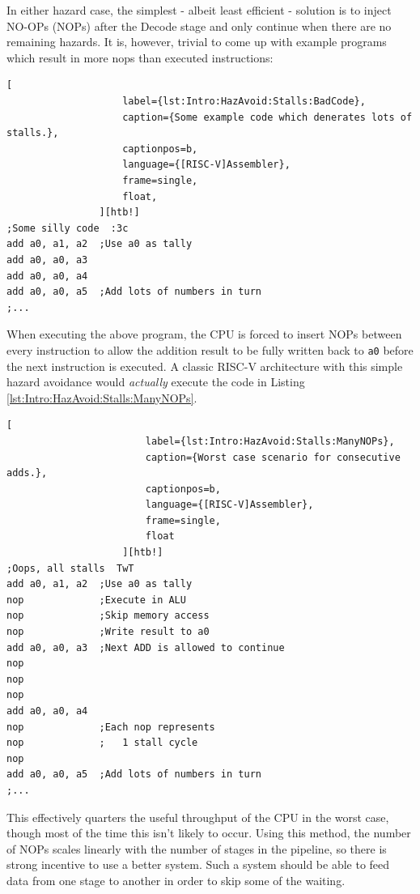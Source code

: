 \documentclass[a4paper, 11pt]{article}
\begin{document}
                In either hazard case, the simplest - albeit least efficient -
                solution is to inject NO-OPs (NOPs) after the Decode stage
                and only continue when there are no remaining hazards.
                It is, however, trivial to come up with example programs which
                result in more nops than executed instructions:

                \begin{lstlisting}[
                    label={lst:Intro:HazAvoid:Stalls:BadCode},
                    caption={Some example code which denerates lots of stalls.},
                    captionpos=b,
                    language={[RISC-V]Assembler}, 
                    frame=single,
                    float,
                ][htb!]
;Some silly code  :3c
add a0, a1, a2  ;Use a0 as tally
add a0, a0, a3
add a0, a0, a4
add a0, a0, a5  ;Add lots of numbers in turn
;...
                \end{lstlisting}

                When executing the above program, the CPU is forced to insert 
                NOPs between every instruction to allow the addition result to 
                be fully written back to 
                \lstinline[language={[RISC-V]Assembler}]|a0| before the next 
                instruction is executed. 
                A classic RISC-V architecture with this simple hazard avoidance 
                would \emph{actually} execute the code in Listing 
                \ref{lst:Intro:HazAvoid:Stalls:ManyNOPs}.

                \begin{lstlisting}[
                        label={lst:Intro:HazAvoid:Stalls:ManyNOPs},
                        caption={Worst case scenario for consecutive adds.},
                        captionpos=b,
                        language={[RISC-V]Assembler},
                        frame=single,
                        float
                    ][htb!]
;Oops, all stalls  TwT
add a0, a1, a2  ;Use a0 as tally
nop             ;Execute in ALU
nop             ;Skip memory access
nop             ;Write result to a0
add a0, a0, a3  ;Next ADD is allowed to continue
nop
nop
nop
add a0, a0, a4
nop             ;Each nop represents
nop             ;   1 stall cycle
nop
add a0, a0, a5  ;Add lots of numbers in turn
;...
                \end{lstlisting}


                This effectively quarters the useful throughput of the CPU in 
                the worst case, though most of the time this isn't likely to 
                occur.
                Using this method, the number of NOPs scales linearly with the
                number of stages in the pipeline, so there is strong incentive
                to use a better system. 
                Such a system should be able to feed data from one stage to 
                another in order to skip some of the waiting.
\end{document}
